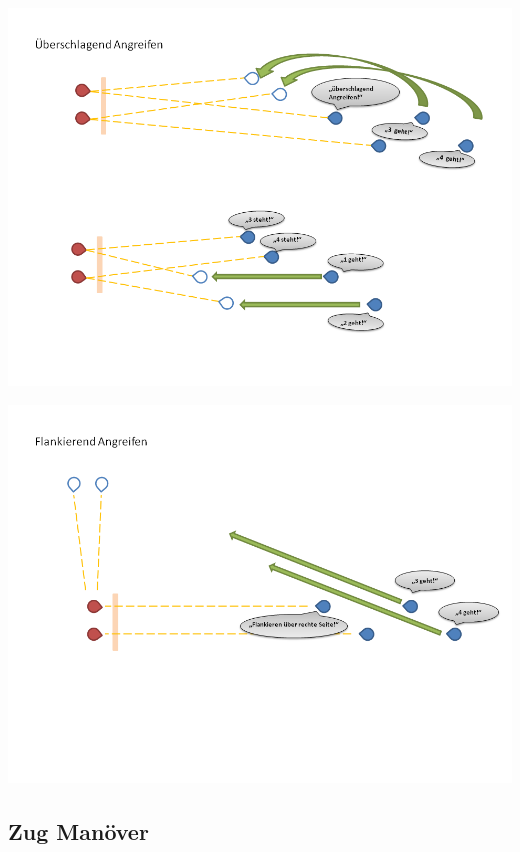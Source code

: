 \begin{minipage}[t]{1\textwidth}
\includegraphics[width=\textwidth]{./Grafiken/Abschnitt/Ueberschlagen_Trupp.png}
\end{minipage}

\begin{minipage}[t]{1\textwidth}
\includegraphics[width=\textwidth]{./Grafiken/Abschnitt/Ueberschlagen_Trupp_2.png}
\end{minipage}

\subsection{Zug Manöver}